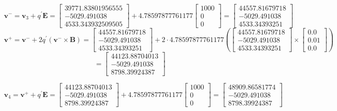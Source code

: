 \documentclass[12pt]{article}
\begin{document}
$\boldsymbol{v}^{-} = \boldsymbol{v}_{3} + q^{\prime} \mathbf{E} = \begin{bmatrix} 
	39771.83801956555 \\ -5029.491038 \\ 4533.343932509505
\end{bmatrix} + 4.78597877761177 \begin{bmatrix}
 1000 \\ 0 \\ 0 
\end{bmatrix} = \begin{bmatrix}
44557.81679718 \\ -5029.491038 \\  4533.34393251
\end{bmatrix}$
$$\boldsymbol{v}^{+} = \boldsymbol{v}^{-} + 2 q^{\prime} \left( \boldsymbol{v}^{-} \times \mathbf{B} \right) = \begin{bmatrix}
	44557.81679718 \\ -5029.491038 \\  4533.34393251
\end{bmatrix} + 2 \cdot 4.78597877761177 \left( \begin{bmatrix}
44557.81679718 \\ -5029.491038 \\  4533.34393251
\end{bmatrix} \times \begin{bmatrix}
0.0 \\ 0.01 \\ 0.0
\end{bmatrix} \right)$$ $$ = \begin{bmatrix}
44123.88704013 \\ -5029.491038 \\ 8798.39924387
\end{bmatrix}$$
\begin{tcolorbox}
	$$\boldsymbol{v}_{4} = \boldsymbol{v}^{+} + q^{\prime} \mathbf{E} = \begin{bmatrix}
	44123.88704013 \\ -5029.491038 \\ 8798.39924387
\end{bmatrix} + 4.78597877761177 \begin{bmatrix}
1000 \\ 0 \\ 0 
\end{bmatrix} = \begin{bmatrix}
48909.86581774 \\ -5029.491038 \\  8798.39924387
\end{bmatrix}$$
\end{tcolorbox}
\end{document}
